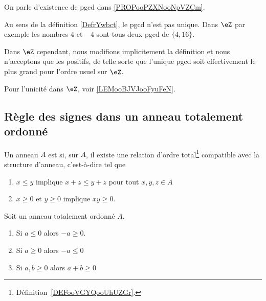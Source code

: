 \begin{remark}\label{REMooExistenceUnicitePGCD}
	On parle d'existence de pgcd dans \ref{PROPooPZXNooNpVZCm}.

	Au sens de la définition \ref{DefrYwbct}, le pgcd n'est pas unique. Dans \( \eZ\) par exemple les nombres \( 4\) et \( -4\) sont tous deux pgcd de \( \{4,16  \}\).

	Dans \( \eZ\) cependant, nous modifions implicitement la définition et nous n'acceptons que les positifs, de telle sorte que l'unique pgcd soit effectivement le plus grand pour l'ordre usuel sur \( \eZ\).

	Pour l'unicité dans \( \eZ\), voir \ref{LEMooBJVJooFyuFeN}.
\end{remark}


\subsection{Règle des signes dans un anneau totalement ordonné}
\label{SUBooSignesAnnTotOrdonne}

\begin{definition}	\label{DEFooWACWooDWvXKJ}
	Un anneau \( A\) est  si, sur \( A \),  il existe une relation d'ordre total\footnote{Définition~\ref{DEFooVGYQooUhUZGr}.} compatible avec la structure d'anneau, c'est-à-dire tel que
	\begin{enumerate}
		\item       \label{ITEMooZISJooWNxnBj}
		      \( x\leq y\) implique \( x+z\leq y+z\) pour tout \( x,y,z\in A\)
		\item   \label{CONDooBYYDooElXgPO}
		      \( x\geq 0\) et \( y\geq 0\) implique \( xy\geq 0\).
	\end{enumerate}
\end{definition}


\begin{proposition}	\label{PROPooELXCooCYzEVD}
	Soit un anneau totalement ordonné \( A\).
	\begin{enumerate}
		\item   \label{ITEMooRRUGooRUpYwt}
		      Si \( a\leq 0\) alors \( -a\geq 0\).
		\item	\label{ITEMooNKYCooCmqHsO}
		      Si \( a\geq 0\) alors \( -a\leq 0\)
		\item	\label{ITEMooXOTGooYxKubR}
		      Si \( a,b\geq 0\) alors \( a+b\geq 0\)
	\end{enumerate}
\end{proposition}

